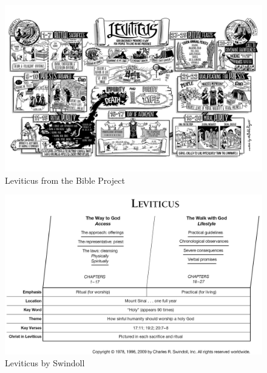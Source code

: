 
\newpage
\begin{figure}
\begin{center}
\includegraphics[scale=0.5, angle=90]{03OT-Leviticus/References/BibleProject-Leviticus.jpg}
\caption[Leviticus from the Bible Project]{Leviticus from the Bible Project}
\label{fig:Leviticus from the Bible Project}
\end{center}
\end{figure}

\newpage
\begin{figure}
\begin{center}
\includegraphics[scale=0.3, angle=90]{03OT-Leviticus/References/Swindoll-Leviticus.png}
\caption[Leviticus by Swindoll]{Leviticus by Swindoll}
\label{fig:Leviticus by Swindoll}
\end{center}
\end{figure}

